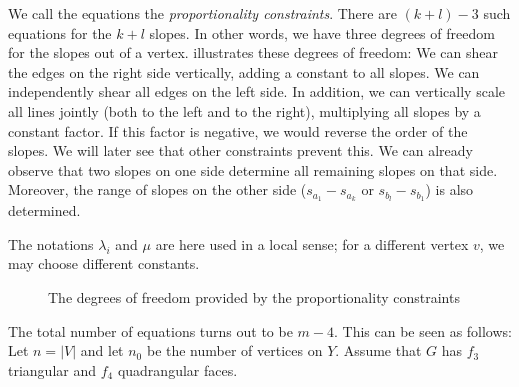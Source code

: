 \documentclass{patmorin}
\begin{document}
We call the equations
\thetag{\ref{eq:proportion}--\ref{eq:proportion2}} the
\emph{proportionality constraints}.
There are $(k+l)-3$ such equations for the $k+l$ slopes. In
other words, we have three degrees of freedom for the slopes out of a vertex.
 illustrates these  degrees of freedom:
We can shear the edges on the right side vertically, adding a constant to all
slopes.
 We can independently shear all edges on the left side.
In addition, we can vertically scale {all} lines jointly (both to
the left and to the right), multiplying all slopes by a constant factor.
If this factor is negative, we would reverse the order of the
slopes. We will later see that other constraints prevent this.
We can already observe that two slopes on one side determine all
remaining slopes on that side. Moreover, the range of slopes
on the other side
($s_{a_1}-s_{a_{k}}$ or $s_{b_{l}}-s_{b_1}$) is also determined.

The notations $\lambda_i$ and $\mu$ are here used in a local sense;
for a different vertex $v$, we may choose different constants.
\begin{figure}
     \caption{The degrees of freedom provided by the proportionality constraints}
  \end{figure}
The total number of equations
\thetag{\ref{eq:slope0}--\ref{eq:proportion2}} turns out to be $m-4$.
This can be seen as follows: Let $n=|V|$ and let $n_0$ be the number
of vertices on $Y$. Assume that $G$ has $f_3$ triangular and $f_4$
quadrangular faces.
\end{document}
